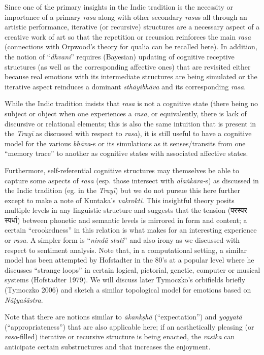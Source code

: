 Since one of the primary insights in the Indic tradition is the necessity or importance of a primary \textsl{rasa} along with other secondary \textsl{rasa}s all through an artistic performance, iterative (or recursive) structures are a necessary aspect of a creative work of art so that the repetition or recursion reinforces the main \textsl{rasa} (connections with Orpwood’s theory for qualia can be recalled here). In addition, the notion of “\textsl{dhvani}” requires (Bayesian) updating of cognitive receptive structures (as well as the corresponding affective ones) that are revisited either because real emotions with its intermediate structures are being simulated or the iterative aspect reinduces a dominant \textsl{sthāyibhāva} and its corresponding \textsl{rasa}.

While the Indic tradition insists that \textsl{rasa} is not a cognitive state (there being no subject or object when one experiences a \textsl{rasa}, or equivalently, there is lack of discursive or relational elements; this is also the same intuition that is present in the \textsl{Trayī} as discussed with respect to \textsl{rasa}), it is still useful to have a cognitive model for the various \textsl{bhāva}-s or its simulations as it senses/transits from one “memory trace” to another as cognitive states with associated affective states.

Furthermore, self-referential cognitive structures may themselves be able to capture some aspects of \textsl{rasa} (esp. those intersect with \textsl{alaṅkāra-}s) as discussed in the Indic tradition (eg. in the \textsl{Trayī}) but we do not pursue this here further except to make a note of Kuntaka's \textsl{vakrokti}. This insightful theory posits multiple levels in any linguistic structure and suggests that the tension ({\dev परस्पर स्पर्धा}) between phonetic and semantic levels is mirrored in form and content; a certain “crookedness” in this relation is what makes for an interesting experience or \textsl{rasa}. A simpler form is “\textsl{nindā} \textsl{stuti}” and also irony as we discussed with respect to sentiment analysis. Note that, in a computational setting, a similar model has been attempted by Hofstadter in the 80's at a popular level where he discusses “strange loops” in certain logical, pictorial, genetic, computer or musical systems (Hofstadter 1979). We will discuss later Tymoczko’s orbifields briefly (Tymoczko 2006) and sketch a similar topological model for emotions based on \textsl{Nāṭyaśāstra}.

Note that there are notions similar to \textsl{ākankṣhā} (“expectation”) and \textsl{yogyatā} (“appropriateness”) that are also applicable here; if an aesthetically pleasing (or \textsl{rasa}-filled) iterative or recursive structure is being enacted, the \textsl{rasika} can anticipate certain substructures and that increases the enjoyment.

